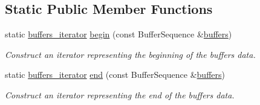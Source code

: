\subsection*{Static Public Member Functions}
\begin{DoxyCompactItemize}
\item 
static \hyperlink{classasio_1_1buffers__iterator}{buffers\+\_\+iterator} \hyperlink{classasio_1_1buffers__iterator_aecff0dd2b24d9eba7b8e7daca055f4f2}{begin} (const Buffer\+Sequence \&\hyperlink{group__async__read_ga54dede45c3175148a77fe6635222c47d}{buffers})
\begin{DoxyCompactList}\small\item\em Construct an iterator representing the beginning of the buffers\textquotesingle{} data. \end{DoxyCompactList}\item 
static \hyperlink{classasio_1_1buffers__iterator}{buffers\+\_\+iterator} \hyperlink{classasio_1_1buffers__iterator_a3469da42115389186d5a2efd4634d187}{end} (const Buffer\+Sequence \&\hyperlink{group__async__read_ga54dede45c3175148a77fe6635222c47d}{buffers})
\begin{DoxyCompactList}\small\item\em Construct an iterator representing the end of the buffers\textquotesingle{} data. \end{DoxyCompactList}\end{DoxyCompactItemize}
